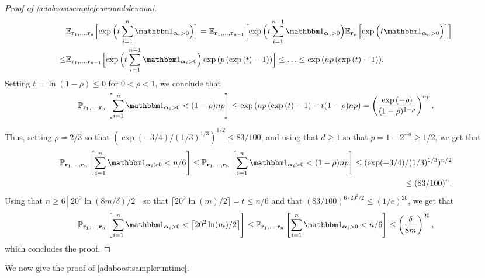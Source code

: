 \begin{proof}[Proof of \cref{adaboostsamplefewroundslemma}]
\begin{align*}
 &\e_{\rr_{1},\ldots,\rr_{n}}\Big[{\exp{\Big(t\sum_{i=1}^{n}\ind_{\alphar_i>0} \Big)}}\Big]
 =\e_{\rr_{1},\ldots,\rr_{n-1}}\Big[{\exp{\Big(t\sum_{i=1}^{n-1}\ind_{\alphar_i>0} \Big)}\e_{\rr_{n}}\Big[{\exp{\Big(t\ind_{\alphar_n>0} \Big)}}\Big]}\Big]\\
\leq&\e_{\rr_{1},\ldots,\rr_{n-1}}\Big[{\exp{\Big(t\sum_{i=1}^{n-1}\ind_{\alphar_i>0} \Big)}\exp{\left(p\left(\exp{\left(t \right)}-1\right) \right)}}\Big]
 \leq \hdots
\leq \exp{\left(np\left(\exp{\left(t \right)}-1\right) \right)}.
\end{align*}
Setting $t=\ln{\left(1-\rho \right)}\leq 0$ for $0<\rho<1$, we conclude that 
\begin{align*}
\p_{\rr_{1},\ldots,\rr_{n}}\left[\sum_{i=1}^{n}\ind_{\alphar_i>0}< (1-\rho)np\right]\leq \exp{\left(np\left(\exp{\left(t \right)}-1\right)-t(1-\rho)np \right)}=\left(\frac{\exp{\left(-\rho \right)}}{(1-\rho)^{1-\rho}}\right)^{np}.
\end{align*}

Thus, setting $\rho=2/3$ so that $ (\exp(-3/4)/(1/3)^{1/3})^{1/2}\leq 83/100 $, and using that $d\geq 1$ so that $p=1-2^{-d}\geq 1/2$, we get that
\begin{align*}
\p_{\rr_{1},\ldots,\rr_{n}}\left[\sum_{i=1}^{n}\ind_{\alphar_i>0}< n/6\right]\leq \p_{\rr_{1},\ldots,\rr_{n}}\left[\sum_{i=1}^{n}\ind_{\alphar_i>0}< (1-\rho)np\right]\leq (\exp(-3/4)/(1/3)^{1/3})^{n/2}\\\leq (83/100)^{n}.
    \end{align*}
Using that $n\geq 6\left\lceil20^{2}\ln{(8m/\delta)}/2\right\rceil$ so that $\lceil20^{2}\ln{(m )/2}\rceil=t\leq n/6$ and that $(83/100)^{6\cdot20^{2}/2}\leq (1/e)^{20}$, we get that 
\begin{align*}
\p_{\rr_{1},\ldots,\rr_{n}}\left[\sum_{i=1}^{n}\ind_{\alphar_i>0}< \left\lceil 20^{2}\ln(m)/2 \right\rceil\right]\leq \p_{\rr_{1},\ldots,\rr_{n}}\left[\sum_{i=1}^{n}\ind_{\alphar_i>0}< n/6\right]
\leq \left(\frac{\delta}{8m}\right)^{ 20},
    \end{align*} 
which concludes the proof. 

\end{proof}

We now give the proof of \cref{adaboostsampleruntime}.

